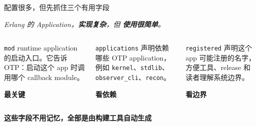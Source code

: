 \documentclass[aspectratio=169, 9pt]{beamer}
\newcommand{\keypoint}[1]{\textbf{\color{primary}#1}}
\newcommand{\good}[1]{\textbf{\color{accent!80!black}#1}}
\newcommand{\code}[1]{\texttt{#1}}
\begin{document}
\begin{frame}{配置很多，但先抓住三个有用字段}
  \vspace{-0.2cm}
  \begin{center}
    \textit{\large Erlang 的 Application，\keypoint{实现复杂}，但 \good{使用很简单}。}
  \end{center}
  \vspace{0.1cm}
  \begin{columns}[T,onlytextwidth]
    \begin{block}{\code{mod}}
      \footnotesize
      runtime application 的启动入口。它告诉 OTP：启动这个 app 时调用哪个 callback module。
      \vspace{0.25cm}

      \centering
      \good{最关键}
    \end{block}
    \begin{exampleblock}{\code{applications}}
      \footnotesize
      声明依赖哪些 OTP application，例如 \code{kernel}、\code{stdlib}、\code{observer\_cli}、\code{recon}。
      \vspace{0.25cm}

      \centering
      \good{看依赖}
    \end{exampleblock}
    \begin{alertblock}{\code{registered}}
      \footnotesize
      声明这个 app 可能注册的名字，方便工具、release 和读者理解系统边界。
      \vspace{0.25cm}

      \centering
      \good{看边界}
    \end{alertblock}
  \end{columns}
  \vspace{0.3cm}
  \centering
  \Large \keypoint{这些字段不用记忆，全部是由构建工具自动生成}
\end{frame}
\end{document}
